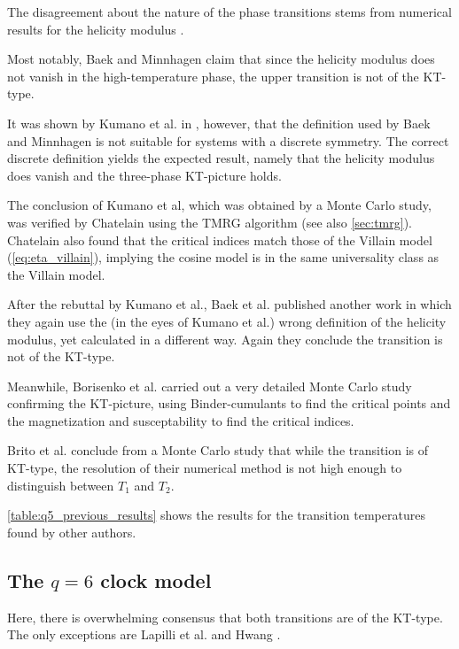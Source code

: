 The disagreement about the nature of the phase transitions
stems from numerical results for the helicity modulus
\cite{fisher1973helicity}.

Most notably, Baek and Minnhagen \cite{baek2010non} claim that since the helicity modulus does
not vanish in the high-temperature phase, the upper transition is not of the KT-type.

It was shown by Kumano et al.
in \cite{kumano2013response}, however, that the definition used by Baek and Minnhagen is not suitable for systems with a
discrete symmetry.
The correct discrete definition yields the expected result, namely that the helicity modulus does vanish and the
three-phase KT-picture holds.

The conclusion of Kumano et al, which was obtained by a Monte Carlo study,
was verified by Chatelain \cite{chatelain2014dmrg} using the TMRG algorithm \cite{nishino1995density} (see also
\autoref{sec:tmrg}).
Chatelain also found that the critical indices match those of the Villain model (\autoref{eq:eta_villain}),
implying the cosine model is in the same universality class as the Villain model.

After the rebuttal by Kumano et al., Baek et al.
published another work \cite{baek2013residual} in which they again use the (in the eyes of Kumano et al.) wrong
definition of the helicity modulus, yet calculated in a different way.
Again they conclude the transition is not of the KT-type.

Meanwhile, Borisenko et al.
\cite{borisenko2011numerical} carried out a very detailed Monte Carlo study confirming the KT-picture,
using Binder-cumulants to find the critical points and the magnetization and susceptability to find the critical
indices.

Brito et al.
\cite{brito2010twodimensional} conclude from a Monte Carlo study that while the transition is of KT-type,
the resolution of their numerical method is not high enough to distinguish between $T_1$ and $T_2$.

\autoref{table:q5_previous_results} shows the results for the transition temperatures found by other authors.

\subsection{The $q = 6$ clock model}

Here, there is overwhelming consensus that both transitions are of the KT-type.
The only exceptions are Lapilli et al. \cite{lapilli2006universality} and Hwang \cite{hwang2009six}.


